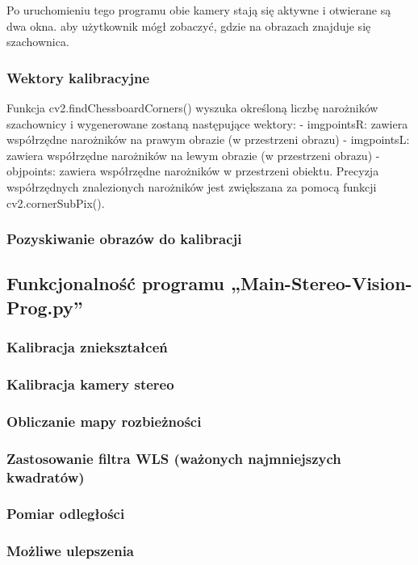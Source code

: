 \documentclass[magisterska]{pracadypl}
\begin{document}
Po uruchomieniu tego programu obie kamery stają się aktywne i otwierane są dwa okna.
aby użytkownik mógł zobaczyć, gdzie na obrazach znajduje się szachownica.

\subsubsection{Wektory kalibracyjne}

Funkcja cv2.findChessboardCorners() wyszuka określoną liczbę narożników szachownicy
i wygenerowane zostaną następujące wektory:
- imgpointsR: zawiera współrzędne narożników na prawym obrazie (w przestrzeni obrazu)
- imgpointsL: zawiera współrzędne narożników na lewym obrazie (w przestrzeni obrazu)
- objpoints: zawiera współrzędne narożników w przestrzeni obiektu.
Precyzja współrzędnych znalezionych narożników jest zwiększana za pomocą funkcji
cv2.cornerSubPix().

\subsubsection{Pozyskiwanie obrazów do kalibracji}
\subsection{Funkcjonalność programu „Main-Stereo-Vision-Prog.py”}
\subsubsection{Kalibracja zniekształceń}
\subsubsection{Kalibracja kamery stereo}
\subsubsection{Obliczanie mapy rozbieżności}
\subsubsection{Zastosowanie filtra WLS (ważonych najmniejszych kwadratów)}
\subsubsection{Pomiar odległości}
\subsubsection{Możliwe ulepszenia}
\end{document}
